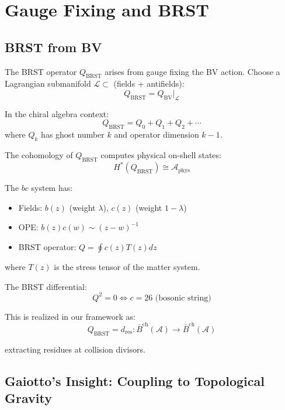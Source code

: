 \section{Gauge Fixing and BRST}

\subsection{BRST from BV}

\begin{definition}
The BRST operator $Q_{\text{BRST}}$ arises from gauge fixing the BV action. 
Choose a Lagrangian submanifold $\mathcal{L} \subset$ (fields + antifields):
$$Q_{\text{BRST}} = Q_{\text{BV}}|_{\mathcal{L}}$$

In the chiral algebra context:
$$Q_{\text{BRST}} = Q_0 + Q_1 + Q_2 + \cdots$$
where $Q_k$ has ghost number $k$ and operator dimension $k-1$.
\end{definition}

\begin{theorem}[BRST Cohomology = Physical States]
The cohomology of $Q_{\text{BRST}}$ computes physical on-shell states:
$$H^*(Q_{\text{BRST}}) \cong \mathcal{A}_{\text{phys}}$$
\end{theorem}

\begin{example}
The $bc$ system has:
\begin{itemize}
\item Fields: $b(z)$ (weight $\lambda$), $c(z)$ (weight $1-\lambda$)
\item OPE: $b(z)c(w) \sim (z-w)^{-1}$
\item BRST operator: $Q = \oint c(z) T(z) dz$
\end{itemize}

where $T(z)$ is the stress tensor of the matter system.

The BRST differential:
$$Q^2 = 0 \iff c = 26 \text{ (bosonic string)}$$

This is realized in our framework as:
$$Q_{\text{BRST}} = d_{\text{res}} : \bar{B}^{\text{ch}}(\mathcal{A}) 
\to \bar{B}^{\text{ch}}(\mathcal{A})$$

extracting residues at collision divisors.
\end{example}

\subsection{Gaiotto's Insight: Coupling to Topological Gravity}


